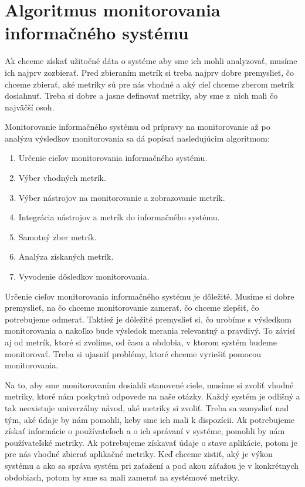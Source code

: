 \documentclass[a4paper, upjsfrontpage, thesismargins, thesislinespacing]{rnthesis}
\begin{document}
\chapter{Algoritmus monitorovania informačného systému}

Ak chceme získať užitočné dáta o systéme aby sme ich mohli analyzovať, musíme ich najprv zozbierať.
Pred zbieraním metrík si treba najprv dobre premyslieť, čo chceme zbierať, 
aké metriky sú pre nás vhodné a aký cieľ chceme zberom metrík dosiahnuť.
Treba si dobre a jasne definovať metriky, aby sme z~nich mali čo najväčší osoh.


Monitorovanie informačného systému od prípravy na monitorovanie až po analýzu výsledkov monitorovania sa dá popísať nasledujúcim algoritmom:

\begin{enumerate}
	\item Určenie cieľov monitorovania informačného systému.
	\item Výber vhodných metrík.
	\item Výber nástrojov na monitorovanie a zobrazovanie metrík.
	\item Integrácia nástrojov a metrík do informačného systému.
	\item Samotný zber metrík.
	\item Analýza získaných metrík.
	\item Vyvodenie dôsledkov monitorovania.
\end{enumerate}

Určenie cieľov monitorovania informačného systému je dôležité.
Musíme si dobre premyslieť, na čo chceme monitorovanie zamerať, čo chceme zlepšiť, čo potrebujeme odmerať.
Taktiež je dôležité premyslieť si, čo urobíme s výsledkom monitorovania a nakoľko bude výsledok merania relevantný a pravdivý.
To závisí aj od metrík, ktoré si zvolíme, od času a obdobia, v ktorom systém budeme monitorovať.
Treba si ujasniť problémy, ktoré chceme vyriešiť pomocou monitorovania.

Na to, aby sme monitorovaním dosiahli stanovené ciele, musíme si zvoliť vhodné metriky, 
	ktoré nám poskytnú odpovede na naše otázky.
Každý systém je odlišný a tak neexistuje univerzálny návod, aké metriky si zvoliť.
Treba sa zamyslieť nad tým, aké údaje by nám pomohli, keby sme ich mali k dispozícii.
Ak potrebujeme získať informácie o používateľoch a o ich správaní v systéme, pomohli by nám používateľské metriky.
Ak potrebujeme získavať údaje o stave aplikácie, potom je pre nás vhodné zbierať aplikačné metriky.
Keď chceme zistiť, aký je výkon systému a ako sa správa systém pri zaťažení a pod akou záťažou je v konkrétnych obdobiach, potom by sme sa mali zamerať na systémové metriky.
\end{document}
